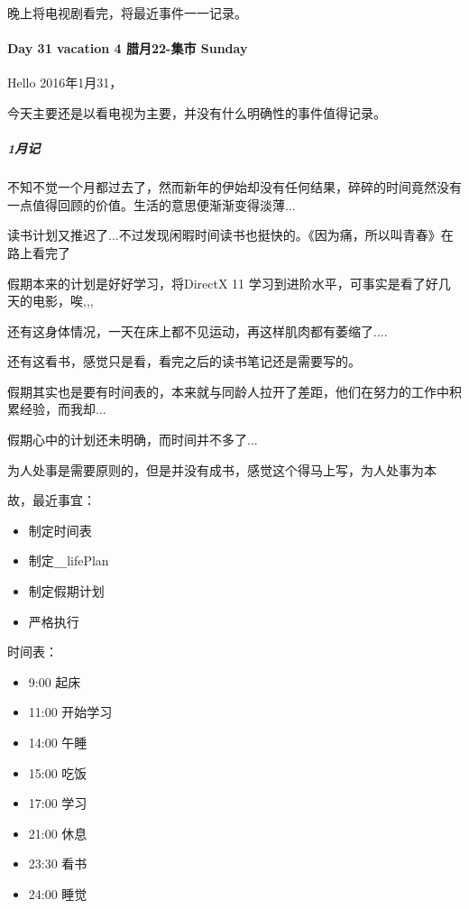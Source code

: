 \documentclass[UTF8,a4paper,8pt]{ctexbook}
\begin{document}
	     晚上将电视剧看完，将最近事件一一记录。
     \paragraph{Day 31   vacation 4   \quad   腊月22-集市 \quad Sunday }
	     Hello 2016年1月31，
	     
	     今天主要还是以看电视为主要，并没有什么明确性的事件值得记录。
	     \subparagraph{1月记}
	     不知不觉一个月都过去了，然而新年的伊始却没有任何结果，碎碎的时间竟然没有一点值得回顾的价值。生活的意思便渐渐变得淡薄...
	     
	     读书计划又推迟了...不过发现闲暇时间读书也挺快的。《因为痛，所以叫青春》在路上看完了
	     
	     假期本来的计划是好好学习，将DirectX 11 学习到进阶水平，可事实是看了好几天的电影，唉,,,
	     
	     还有这身体情况，一天在床上都不见运动，再这样肌肉都有萎缩了....
	     
	     还有这看书，感觉只是看，看完之后的读书笔记还是需要写的。
	     
	     假期其实也是要有时间表的，本来就与同龄人拉开了差距，他们在努力的工作中积累经验，而我却...
	     
	     假期心中的计划还未明确，而时间并不多了... 
	     
	     为人处事是需要原则的，但是并没有成书，感觉这个得马上写，为人处事为本
	     
	     故，最近事宜：
		 \begin{itemize}[fullwidth,itemindent = 2em]
		  	\item  制定时间表
		 	\item  制定\verb|__|lifePlan
		 	\item  制定假期计划
		 	\item  严格执行
		 \end{itemize} 
		 
		 时间表：
		 \begin{itemize}[fullwidth,itemindent = 2em]
		 	\item  9:00 起床
		 	\item  11:00 开始学习
		 	\item  14:00 午睡
		 	\item  15:00 吃饭
		 	\item  17:00 学习
		 	\item  21:00 休息
		 	\item  23:30 看书
		 	\item  24:00 睡觉
		 \end{itemize}
		 
\end{document}
